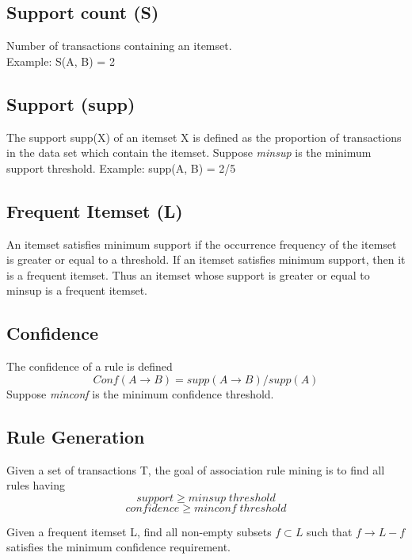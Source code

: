 \subsection{Support count (S)}
Number of transactions containing an itemset. \\
Example: S({A, B}) = 2

\subsection{Support (supp)}
The support supp(X) of an itemset X is defined as the proportion of transactions in the data set which contain the itemset.
Suppose \textit{minsup} is the minimum support threshold.
Example: supp({A, B}) = 2/5

\subsection{Frequent Itemset (L)}
An itemset satisfies minimum support if the occurrence frequency of the itemset
is greater or equal to a threshold. If an itemset satisfies minimum support, then it is a frequent itemset.
Thus an itemset whose support is greater or equal to minsup is a frequent itemset.

\subsection{Confidence}
The confidence of a rule is defined \\
\begin{equation}
Conf(A \rightarrow B) = supp(A \rightarrow  B) / supp(A)
\end{equation}
Suppose \textit{minconf} is the minimum confidence threshold.

\subsection{Rule Generation}
Given a set of transactions T, the goal of association rule mining is to find all rules having\\
\begin{equation}
support \geq minsup \; threshold
\end{equation}
\begin{equation}
confidence \geq minconf \; threshold
\end{equation}

Given a frequent itemset L, find all non-empty subsets $f \subset L$ such that $f \rightarrow  L - f$ satisfies the minimum confidence requirement.

